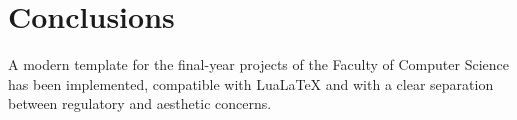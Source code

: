 \chapter{Conclusions}

A modern template for the final-year projects of the Faculty of
Computer Science has been implemented, compatible with Lua\LaTeX{}
and with a clear separation between regulatory and aesthetic concerns.
